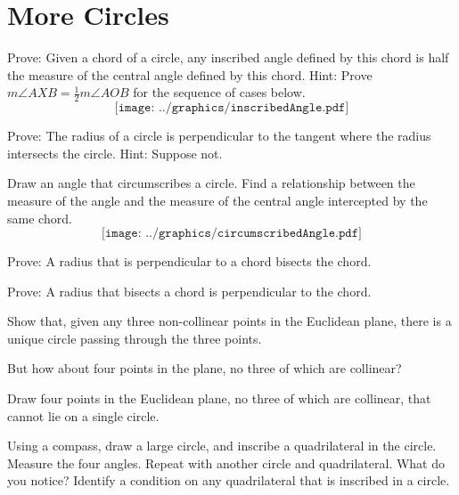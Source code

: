\newpage

\section{More Circles}

\begin{prob}
Prove:  Given a chord of a circle, any inscribed angle defined by this chord is half the measure of the central angle defined by this
chord.  Hint:  Prove $m\angle AXB = \frac{1}{2}m\angle AOB$ for the sequence of cases below.  
$$\texttt{[image: ../graphics/inscribedAngle.pdf]}$$
\end{prob}

\begin{prob}
Prove: The radius of a circle is perpendicular to the tangent where the radius intersects the circle.  Hint:  Suppose not. 
\end{prob}

\begin{prob}
Draw an angle that circumscribes a circle.  Find a relationship between the measure of the angle and the measure of the central angle intercepted by the same chord.
$$\texttt{[image: ../graphics/circumscribedAngle.pdf]}$$
\end{prob}

\begin{prob}
Prove: A radius that is perpendicular to a chord bisects the chord. 
\end{prob}

\begin{prob}
Prove:  A radius that bisects a chord is perpendicular to the chord. 
\end{prob}

\begin{prob}
Show that, given any three non-collinear points in the Euclidean
plane, there is a unique circle passing through the three points.
\end{prob}

But how about four points in the plane, no three of which are collinear?

\begin{prob}
Draw four points in the Euclidean plane, no three of which are collinear, that cannot lie on a single circle.
\end{prob}

\begin{prob}
Using a compass, draw a large circle, and inscribe a quadrilateral in the circle.  Measure the four angles.  Repeat with another circle and quadrilateral.  What do you notice?  Identify a condition on any quadrilateral that is inscribed in a circle.  
\end{prob}

